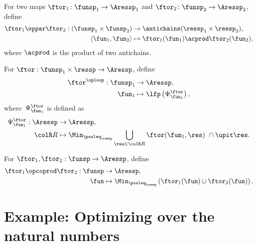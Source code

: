 \begin{definition}
    \label{def:opmaps}
    For two maps $\ftor_{1}\colon\funsp_{1}\rightarrow\Aressp_{1}$
    and $\ftor_{2}\colon\funsp_{2}\rightarrow\Aressp_{2}$, define
    \begin{align}
        \ftor_{1}\oppar\ftor_{2}:(\funsp_{1}\times\funsp_{2}) & \rightarrow\antichains(\ressp_{1}\times\ressp_{2}),\label{eq:oppar}\\
        \left\langle \fun_{1},\fun_{2}\right\rangle  & \mapsto\ftor_{1}(\fun_{1})\acprod\ftor_{2}(\fun_{2}),\nonumber
    \end{align}
    where $\acprod$ is the product of two antichains.
\end{definition}

\begin{definition}
    \label{def:oploop}
    For $\ftor:\funsp_{1}\times\ressp\rightarrow\Aressp$,
    define
    \begin{align}
        \ftor^{\oploop}:\funsp_{1} & \rightarrow\Aressp,\nonumber \\
        \fun_{1} & \mapsto\lfp\left(\Psi_{\fun_{1}}^{\ftor}\right),\label{eq:lfp}
    \end{align}
    where~$\Psi_{\fun_{1}}^{\ftor}$ is defined as
    \begin{align}
        \Psi_{\fun_{1}}^{\ftor}:\Aressp & \rightarrow\Aressp,\nonumber \\
        {\colR R} & \mapsto\Min_{\posleq_{\ressp}}\bigcup_{\res\in{\colR R}}\ftor(\fun_{1},\res)\ \cap\upit\res.\label{eq:phi}
    \end{align}
\end{definition}

\begin{definition}
    \label{def:opcoprod}For $\ftor_{1},\ftor_{2}:\funsp\rightarrow\Aressp$,
    define
    \begin{align*}
        \ftor_{1}\opcoprod\ftor_{2}:\funsp & \rightarrow\Aressp,\\
        \fun& \mapsto\Min_{\posleq_{\ressp}}\left(\ftor_{1}(\fun)\cup\ftor_{2}(\fun)\right).
    \end{align*}
\end{definition}


\section{Example: Optimizing over the natural numbers}

